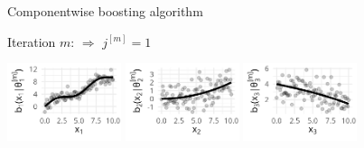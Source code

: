 \documentclass[11pt,compress,t,notes=noshow, xcolor=table]{beamer}
\begin{document}
\begin{vbframe}{Componentwise boosting algorithm}



{\footnotesize Iteration $m$: $\Rightarrow$ $j^{[m]} = 1$}
\begin{center}
\includegraphics[width=0.25\textwidth]{figure/boosting-cwb-bl1-points.png}
\hspace*{0.5cm}
\includegraphics[width=0.25\textwidth]{figure/boosting-cwb-bl2-points.png} 
\hspace*{0.5cm}
\includegraphics[width=0.25\textwidth]{figure/boosting-cwb-bl3-points.png}
\end{center}
\addtocounter{framenumber}{-1}
\end{vbframe}
\end{document}
